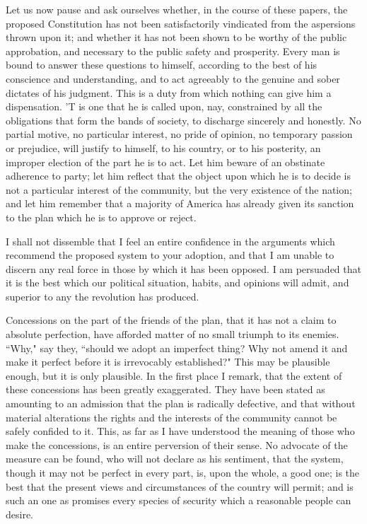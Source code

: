 Let us now pause and ask ourselves whether, in the course of these papers, the proposed Constitution has not been satisfactorily vindicated from the aspersions thrown upon it; and whether it has not been shown to be worthy of the public approbation, and necessary to the public safety and prosperity. 
Every man is bound to answer these questions to himself, according to the best of his conscience and understanding, and to act agreeably to the genuine and sober dictates of his judgment. 
This is a duty from which nothing can give him a dispensation. 
'T is one that he is called upon, nay, constrained by all the obligations that form the bands of society, to discharge sincerely and honestly. 
No partial motive, no particular interest, no pride of opinion, no temporary passion or prejudice, will justify to himself, to his country, or to his posterity, an improper election of the part he is to act. 
Let him beware of an obstinate adherence to party; let him reflect that the object upon which he is to decide is not a particular interest of the community, but the very existence of the nation; and let him remember that a majority of America has already given its sanction to the plan which he is to approve or reject.

I shall not dissemble that I feel an entire confidence in the arguments which recommend the proposed system to your adoption, and that I am unable to discern any real force in those by which it has been opposed. 
I am persuaded that it is the best which our political situation, habits, and opinions will admit, and superior to any the revolution has produced.

Concessions on the part of the friends of the plan, that it has not a claim to absolute perfection, have afforded matter of no small triumph to its enemies. 
``Why," say they, ``should we adopt an imperfect thing? 
Why not amend it and make it perfect before it is irrevocably established?" This may be plausible enough, but it is only plausible. 
In the first place I remark, that the extent of these concessions has been greatly exaggerated. 
They have been stated as amounting to an admission that the plan is radically defective, and that without material alterations the rights and the interests of the community cannot be safely confided to it. 
This, as far as I have understood the meaning of those who make the concessions, is an entire perversion of their sense. 
No advocate of the measure can be found, who will not declare as his sentiment, that the system, though it may not be perfect in every part, is, upon the whole, a good one; is the best that the present views and circumstances of the country will permit; and is such an one as promises every species of security which a reasonable people can desire.

